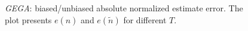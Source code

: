 \documentclass[11pt,a4paper,twoside,openright]{book}
\begin{document}
\begin{figure}[thbp]
 \caption[\emph{GEGA}: Biased/unbiased absolute normalized estimate error]{\emph{GEGA}: biased/unbiased absolute normalized estimate error. The plot presents $e(\hat{n})$ and $e(\tilde{n})$ for different $T$.}
 \label{fg:GEGA-biased-unbiased}
\end{figure}
\end{document}
